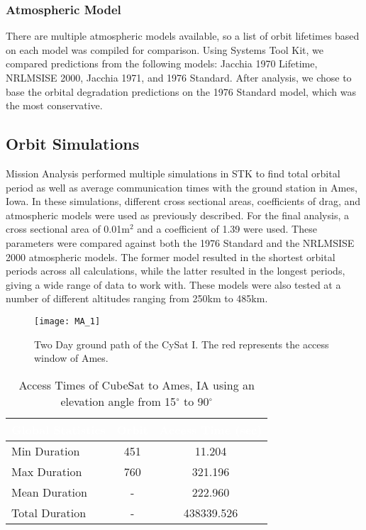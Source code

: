 \documentclass[nocover]            %
{CSLI}                       %
\begin{document}
\subsubsection{Atmospheric Model}
There are multiple atmospheric models available, so a list of orbit lifetimes based on each model was compiled for comparison. Using Systems Tool Kit, we compared predictions from the following models: Jacchia 1970 Lifetime, NRLMSISE 2000, Jacchia 1971, and 1976 Standard. After analysis, we chose to base the orbital degradation predictions on the 1976 Standard model, which was the most conservative.
\subsection{Orbit Simulations}
Mission Analysis performed multiple simulations in STK to find total orbital period as well as average communication times with the ground station in Ames, Iowa. In these simulations, different cross sectional areas, coefficients of drag, and atmospheric models were used as previously described. For the final analysis, a cross sectional area of 0.01m$^2$ and a coefficient of 1.39 were used. These parameters were compared against both the 1976 Standard and the NRLMSISE 2000 atmospheric models. The former model resulted in the shortest orbital periods across all calculations, while the latter resulted in the longest periods, giving a wide range of data to work with. These models were also tested at a number of different altitudes ranging from 250km to 485km.

\begin{figure}[H]

    \texttt{[image: MA\_1]}
    \caption{Two Day ground path of the CySat I. The red represents the access window of Ames.}
\end{figure}

\begin{table}[H]
\centering
\caption{Access Times of CubeSat to Ames, IA using an elevation angle from 15$^\circ$ to 90$^\circ$}
\begin{tabular}{| l | c | c |}
\arrayrulecolor{white}
\hline
\rowcolor{gray!80}
\textcolor{white}{\textbf{Global Statistics}} & \textcolor{white}{\textbf{Orbit}} & \textcolor{white}{\textbf{Access Time (sec)}} \\ \hline
\rowcolor{gray!10}
Min Duration & 451 & 11.204\\ \hline
\rowcolor{gray!5}
Max Duration & 760 &  321.196 \\ \hline
\rowcolor{gray!10}
Mean Duration & - & 222.960 \\ \hline
\rowcolor{gray!5}
Total Duration & - & 438339.526 \\ \hline
\end{tabular}
\end{table}
\end{document}
